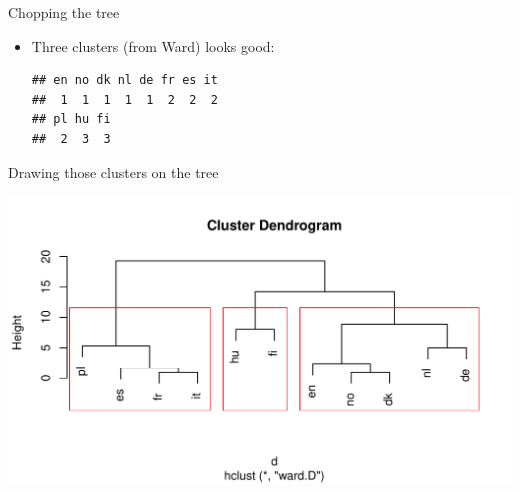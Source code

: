 \begin{frame}[fragile]{Chopping the tree}

  \begin{itemize}
  \item Three clusters (from Ward) looks good:
\begin{knitrout}
\color{fgcolor}\begin{kframe}
\begin{alltt}
\hlstd{)}
\end{alltt}
\begin{verbatim}
## en no dk nl de fr es it 
##  1  1  1  1  1  2  2  2 
## pl hu fi 
##  2  3  3
\end{verbatim}
\end{kframe}
\end{knitrout}
  \end{itemize}
  
\end{frame}

\begin{frame}[fragile]{Drawing those clusters on the tree}
  
\begin{knitrout}
\color{fgcolor}\begin{kframe}
\begin{alltt}
\hlstd{)}
\end{alltt}
\end{kframe}
\includegraphics[width=\maxwidth]{figure/asfsagd-1} 

\end{knitrout}
  
\end{frame}

